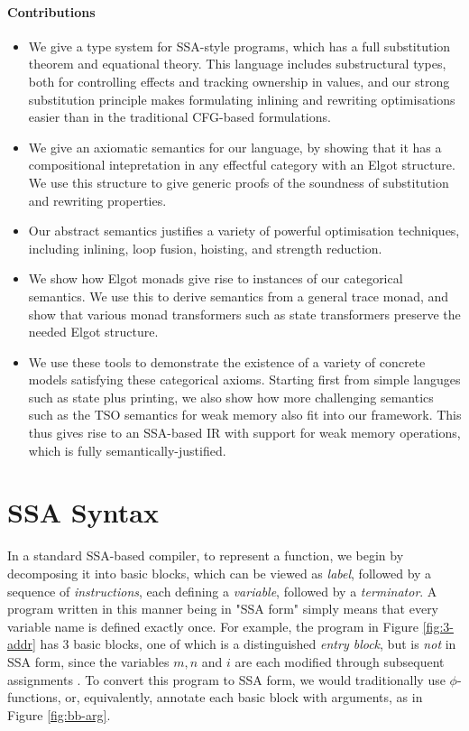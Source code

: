 \documentclass[acmsmall,screen,review]{acmart}
\begin{document}
\paragraph{Contributions} 

\begin{itemize}
\item We give a type system for SSA-style programs, which has a full
substitution theorem and equational theory. This language includes substructural
types, both for controlling effects and tracking ownership in values, and our
strong substitution principle makes formulating inlining and rewriting
optimisations easier than in the traditional CFG-based formulations. 
\item We give an axiomatic semantics for our language, by showing that it has a
compositional intepretation in any effectful category with an Elgot structure.
We use this structure to give generic proofs of the soundness of substitution
and rewriting properties.
\item Our abstract semantics justifies a variety of powerful optimisation
techniques, including inlining, loop fusion, hoisting, and strength reduction. 
\item We show how Elgot monads give rise to instances of our categorical
semantics. We use this to derive semantics from a general trace monad, and show
that various monad transformers such as state transformers preserve the needed
Elgot structure. 
\item We use these tools to demonstrate the existence of a variety of concrete
models satisfying these categorical axioms. Starting first from simple languges
such as state plus printing, we also show how more challenging semantics such as
the TSO semantics for weak memory also fit into our framework. This thus gives
rise to an SSA-based IR with support for weak memory operations, which is fully
semantically-justified.
\end{itemize}

\section{SSA Syntax}

In a standard SSA-based compiler, to represent a function, we begin by
decomposing it into basic blocks, which can be viewed as \textit{label},
followed by a sequence of \textit{instructions}, each defining a
\textit{variable}, followed by a \textit{terminator}. A program written in this
manner being in "SSA form" simply means that every variable name is defined
exactly once. For example, the program in Figure \ref{fig:3-addr} has 3 basic
blocks, one of which is a distinguished \textit{entry block}, but is
\textit{not} in SSA form, since the variables \(m, n\) and \(i\) are each
modified through subsequent assignments .
To convert this program to SSA form, we would traditionally use
\(\phi\)-functions, or, equivalently, annotate each basic block with arguments,
as in Figure \ref{fig:bb-arg}.
\end{document}

